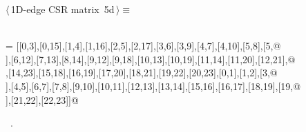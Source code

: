 \documentclass[11pt,oneside]{article}	%
\begin{document}
\begin{flushleft} \small
\begin{minipage}{\linewidth} \label{scrap12}
\protect{}$\langle\,$1D-edge CSR matrix\nobreak\ {\footnotesize 5d}$\,\rangle\equiv$
\vspace{-1ex}
\begin{list}{}{} \item
\mbox{}\verb@@\\
\mbox{}\verb@EV = [[0,3],[0,15],[1,4],[1,16],[2,5],[2,17],[3,6],[3,9],[4,7],[4,10],[5,8],[5,@\\
\mbox{}],[6,12],[7,13],[8,14],[9,12],[9,18],[10,13],[10,19],[11,14],[11,20],[12,21],@\\
\mbox{}\verb@[13,22],[14,23],[15,18],[16,19],[17,20],[18,21],[19,22],[20,23],[0,1],[1,2],[3,@\\
\mbox{}],[4,5],[6,7],[7,8],[9,10],[10,11],[12,13],[13,14],[15,16],[16,17],[18,19],[19,@\\
\mbox{}],[21,22],[22,23]]@\\
\mbox{}\verb@@{\NWsep}
\end{list}
\vspace{-1ex}
\footnotesize\addtolength{\baselineskip}{-1ex}
\begin{list}{}{\setlength{\itemsep}{-\parsep}\setlength{\itemindent}{-\leftmargin}}
\item \NWtxtMacroRefIn\ .
\end{list}
\end{minipage}\\[4ex]
\end{flushleft}
\end{document}
